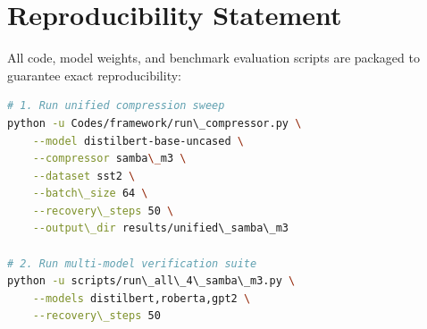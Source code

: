 \section{Reproducibility Statement}
All code, model weights, and benchmark evaluation scripts are packaged to guarantee exact reproducibility:
\begin{lstlisting}[language=bash]
# 1. Run unified compression sweep
python -u Codes/framework/run\_compressor.py \
    --model distilbert-base-uncased \
    --compressor samba\_m3 \
    --dataset sst2 \
    --batch\_size 64 \
    --recovery\_steps 50 \
    --output\_dir results/unified\_samba\_m3

# 2. Run multi-model verification suite
python -u scripts/run\_all\_4\_samba\_m3.py \
    --models distilbert,roberta,gpt2 \
    --recovery\_steps 50
\end{lstlisting}
